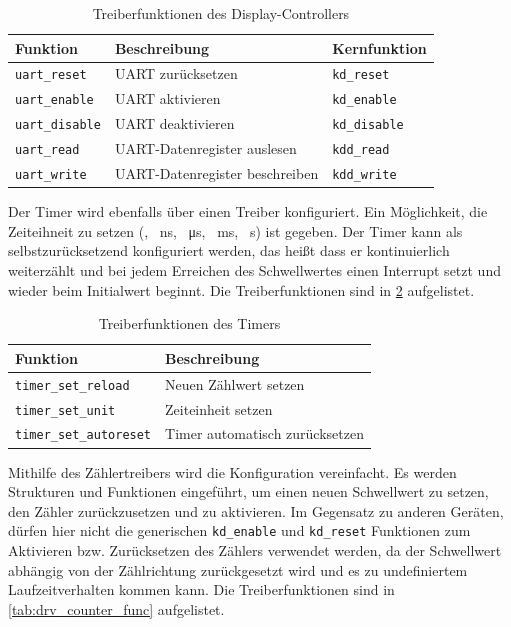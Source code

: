 \begin{table}[!htbp]
	\bigskip
	\centering
	\begin{tabular}{ l | l | l}
		\textbf{Funktion} & \textbf{Beschreibung} & \textbf{Kernfunktion} \\
		\hline		
		\texttt{uart\_reset} & UART zurücksetzen & \texttt{kd\_reset} \\
		\texttt{uart\_enable} & UART aktivieren & \texttt{kd\_enable} \\
		\texttt{uart\_disable} & UART deaktivieren & \texttt{kd\_disable}\\
		\texttt{uart\_read} & UART-Datenregister auslesen & \texttt{kdd\_read}\\
		\texttt{uart\_write} & UART-Datenregister beschreiben & \texttt{kdd\_write}\\
		\hline
	\end{tabular}
	
	\caption{Treiberfunktionen des Display-Controllers}
	\label{tab:drv_uart_func}
\end{table}

Der Timer wird ebenfalls über einen Treiber konfiguriert. Ein Möglichkeit, die Zeiteihneit zu setzen (\SI{}{\tick}, \SI{}{\nano\second}, \SI{}{\micro\second}, \SI{}{\milli\second}, \SI{}{\second}) ist gegeben. Der Timer kann als selbstzurücksetzend konfiguriert werden, das heißt dass er kontinuierlich weiterzählt und bei jedem Erreichen des Schwellwertes einen Interrupt setzt und wieder beim Initialwert beginnt. Die Treiberfunktionen sind in \cref{tab:drv_timer_func} aufgelistet.

\begin{table}[!htbp]
	\bigskip
	\centering
	\begin{tabular}{ l | l }
		\textbf{Funktion} & \textbf{Beschreibung} \\
		\hline		
		\texttt{timer\_set\_reload} & Neuen Zählwert setzen \\
		\texttt{timer\_set\_unit} & Zeiteinheit setzen \\
		\texttt{timer\_set\_autoreset} & Timer automatisch zurücksetzen \\
		\hline
	\end{tabular}
	
	\caption{Treiberfunktionen des Timers}
	\label{tab:drv_timer_func}
\end{table}

Mithilfe des Zählertreibers wird die Konfiguration vereinfacht. Es werden Strukturen und Funktionen eingeführt, um einen neuen Schwellwert zu setzen, den Zähler zurückzusetzen und zu aktivieren. Im Gegensatz zu anderen Geräten, dürfen hier nicht die generischen \texttt{kd\_enable} und \texttt{kd\_reset} Funktionen zum Aktivieren bzw. Zurücksetzen des Zählers verwendet werden, da der Schwellwert abhängig von der Zählrichtung zurückgesetzt wird und es zu undefiniertem Laufzeitverhalten kommen kann.
Die Treiberfunktionen sind in \cref{tab:drv_counter_func} aufgelistet.

